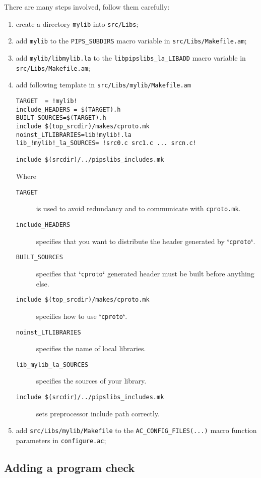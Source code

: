 \documentclass[a4paper]{article}
\newcommand{\file}[1]{\texttt{#1}}
\newcommand{\dir}[1]{\texttt{#1}}
\newcommand{\cmd}[1]{\textbf{`}\texttt{#1}\textbf{`}}
\begin{document}
There are many steps involved, follow them carefully:
\begin{enumerate}
\item create a directory \dir{mylib} into \dir{src/Libs};
\item add \texttt{mylib} to the \texttt{PIPS\_SUBDIRS} macro variable in \file{src/Libs/Makefile.am};
\item add \texttt{mylib/libmylib.la} to the \texttt{libpipslibs\_la\_LIBADD} macro variable  in \file{src/Libs/Makefile.am};
\item add following template in \file{src/Libs/mylib/Makefile.am}
\begin{lstlisting}
TARGET  = !mylib!
include_HEADERS = $(TARGET).h
BUILT_SOURCES=$(TARGET).h
include $(top_srcdir)/makes/cproto.mk
noinst_LTLIBRARIES=lib!mylib!.la
lib_!mylib!_la_SOURCES= !src0.c src1.c ... srcn.c!

include $(srcdir)/../pipslibs_includes.mk
\end{lstlisting}
Where
\begin{description}
\item[\texttt{TARGET}] is used to avoid redundancy and to communicate with \file{cproto.mk}.
\item[\texttt{include\_HEADERS}] specifies that you want to distribute the header generated by \cmd{cproto}.
\item[\texttt{BUILT\_SOURCES}] specifies that  \cmd{cproto} generated header must be built before anything else.
\item[\texttt{include \$(top\_srcdir)/makes/cproto.mk}] specifies how to use \cmd{cproto}.
\item[\texttt{noinst\_LTLIBRARIES}] specifies the name of local libraries.
\item[\texttt{lib\_mylib\_la\_SOURCES}] specifies the sources of your library.
\item[\texttt{include \$(srcdir)/../pipslibs\_includes.mk}] sets preprocessor include path correctly.
\end{description}

\item add \texttt{src/Libs/mylib/Makefile} to the \texttt{AC\_CONFIG\_FILES(...)} macro function parameters in \file{configure.ac};
\end{enumerate}

\subsection{Adding a program check}
\end{document}
